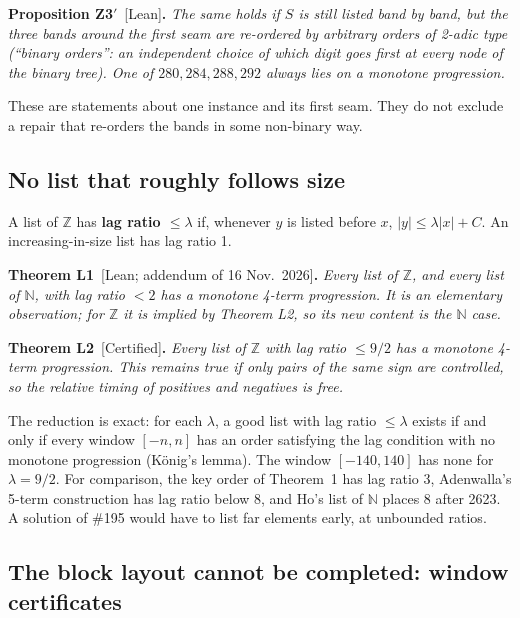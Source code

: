 \documentclass[11pt,letterpaper]{article}
\newcommand{\Z}{\mathbb{Z}}
\newcommand{\N}{\mathbb{N}}
\newcommand{\st}[1]{\textnormal{\textsf{\small[#1]}}}
\newenvironment{result}[2]%
  {\par\medskip\noindent\textbf{#1}\ \st{#2}\textbf{.}\enspace\itshape}%
  {\par\medskip}
\begin{document}
\begin{result}{Proposition Z3$'$}{Lean}
The same holds if $S$ is still listed band by band, but the three bands around the first seam are
re-ordered by \emph{arbitrary} orders of 2-adic type (``binary orders'': an independent choice of which
digit goes first at every node of the binary tree). One of $280, 284, 288, 292$ always lies on a monotone
progression.
\end{result}

These are statements about one instance and its first seam. They do not exclude a repair that re-orders the
bands in some non-binary way.

\subsection{No list that roughly follows size}

A list of $\Z$ has \textbf{lag ratio $\le \lambda$} if, whenever $y$ is listed before $x$,
$|y| \le \lambda |x| + C$. An increasing-in-size list has lag ratio 1.

\begin{result}{Theorem L1}{Lean; addendum of 16 Nov.\ 2026}
Every list of $\Z$, and every list of $\N$, with lag ratio $< 2$ has a monotone 4-term progression. It is an
elementary observation; for $\Z$ it is implied by Theorem L2, so its new content is the $\N$ case.
\end{result}

\begin{result}{Theorem L2}{Certified}
Every list of $\Z$ with lag ratio $\le 9/2$ has a monotone 4-term progression. This remains true if only
pairs of the same sign are controlled, so the relative timing of positives and negatives is free.
\end{result}

The reduction is exact: for each $\lambda$, a good list with lag ratio $\le \lambda$ exists if and only if
every window $[-n,n]$ has an order satisfying the lag condition with no monotone progression (K\"onig's
lemma). The window $[-140,140]$ has none for $\lambda = 9/2$. For comparison, the key order of Theorem~1 has
lag ratio 3, Adenwalla's 5-term construction has lag ratio below 8, and Ho's list of $\N$ places 8 after
2623. A solution of \#195 would have to list far elements early, at unbounded ratios.

\subsection{The block layout cannot be completed: window certificates}
\end{document}
